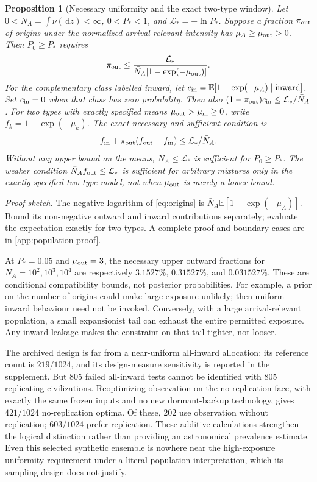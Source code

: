 \documentclass[11pt,a4paper]{article}
\newtheorem{proposition}{Proposition}
\theoremstyle{definition}\newtheorem{definition}{Definition}
\newcommand{\dd}{\,\mathrm{d}}
\begin{document}
\begin{proposition}[Necessary uniformity and the exact two-type window]
\label{prop:uniformity}
Let $0<\bar N_A=\int\nu(\dd z)<\infty$, $0<P_*<1$, and
$\mathcal L_*=-\ln P_*$. Suppose a fraction $\pi_{\rm out}$ of origins under the
normalized arrival-relevant intensity has $\mu_A\geq\mu_{\rm out}>0$.
Then $P_0\geq P_*$ requires
\begin{equation}
 \pi_{\rm out}\leq
 \frac{\mathcal L_*}{\bar N_A[1-\exp(-\mu_{\rm out})]}.
 \label{eq:uniformity-bound}
\end{equation}
For the complementary class labelled inward, let $c_{\rm in}=\mathbb E[1-\exp(-\mu_A)\mid\text{inward}]$.
Set $c_{\rm in}=0$ when that class has zero probability. Then also $(1-\pi_{\rm out})c_{\rm in}\leq \mathcal L_*/\bar N_A$.
For two types with exactly specified means
$\mu_{\rm out}>\mu_{\rm in}\geq0$, write
$f_k=1-\exp(-\mu_k)$. The exact necessary and sufficient condition is
\begin{equation}
 f_{\rm in}+\pi_{\rm out}(f_{\rm out}-f_{\rm in})
 \leq \mathcal L_*/\bar N_A.
 \label{eq:two-type-window}
\end{equation}
Without any upper bound on the means, $\bar N_A\leq \mathcal L_*$ is sufficient
for $P_0\geq P_*$. The weaker condition
$\bar N_Af_{\rm out}\leq \mathcal L_*$ is sufficient for arbitrary mixtures only
in the exactly specified two-type model, not when $\mu_{\rm out}$ is
merely a lower bound.
\end{proposition}
\noindent\emph{Proof sketch.}
The negative logarithm of \cref{eq:origins} is
$\bar N_A\mathbb E[1-\exp(-\mu_A)]$. Bound its non-negative outward
and inward contributions separately; evaluate the expectation exactly
for two types. A complete proof and boundary cases are in
\cref{app:population-proof}.

At $P_*=0.05$ and $\mu_{\rm out}=3$, the necessary upper outward
fractions for $\bar N_A=10^2,10^3,10^4$ are respectively
$3.1527\%$, $0.31527\%$, and $0.031527\%$. These are conditional
compatibility bounds, not posterior probabilities. For example, a prior
on the number of origins could make large exposure unlikely; then
uniform inward behaviour need not be invoked. Conversely, with a large
arrival-relevant population, a small expansionist tail can exhaust the
entire permitted exposure. Any inward leakage makes the constraint on
that tail tighter, not looser.

The archived design is far from a near-uniform all-inward allocation:
its reference count is $219/1024$, and its design-measure sensitivity is
reported in the supplement. But $805$ failed all-inward tests cannot be
identified with $805$ replicating civilizations. Reoptimizing observation
on the no-replication face, with exactly the same frozen inputs and no
new dormant-backup technology, gives $421/1024$ no-replication optima.
Of these, $202$ use observation without replication; $603/1024$ prefer
replication. These additive calculations strengthen the logical
distinction rather than providing an astronomical prevalence estimate.
Even this selected synthetic ensemble is nowhere near the high-exposure
uniformity requirement under a literal population interpretation, which
its sampling design does not justify.
\end{document}
